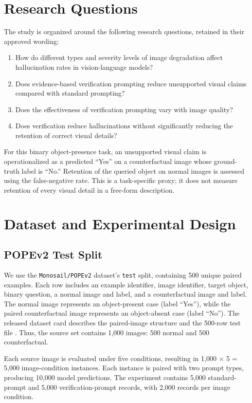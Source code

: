 \documentclass[conference]{IEEEtran}
\begin{document}
\section{Research Questions}
The study is organized around the following research questions, retained in their approved wording:
\begin{enumerate}[label=\textbf{RQ\arabic*:}]
\item How do different types and severity levels of image degradation affect hallucination rates in vision-language models?
\item Does evidence-based verification prompting reduce unsupported visual claims compared with standard prompting?
\item Does the effectiveness of verification prompting vary with image quality?
\item Does verification reduce hallucinations without significantly reducing the retention of correct visual details?
\end{enumerate}
For this binary object-presence task, an unsupported visual claim is operationalized as a predicted ``Yes'' on a counterfactual image whose ground-truth label is ``No.'' Retention of the queried object on normal images is assessed using the false-negative rate. This is a task-specific proxy; it does not measure retention of every visual detail in a free-form description.

\section{Dataset and Experimental Design}
\subsection{POPEv2 Test Split}
We use the \texttt{Monosail/POPEv2} dataset's \texttt{test} split, containing 500 unique paired examples. Each row includes an example identifier, image identifier, target object, binary question, a normal image and label, and a counterfactual image and label. The normal image represents an object-present case (label ``Yes''), while the paired counterfactual image represents an object-absent case (label ``No''). The released dataset card describes the paired-image structure and the 500-row test file \cite{popev2dataset}. Thus, the source set contains 1,000 images: 500 normal and 500 counterfactual.

Each source image is evaluated under five conditions, resulting in 1,000 $\times$ 5 = 5,000 image-condition instances. Each instance is paired with two prompt types, producing 10,000 model predictions. The experiment contains 5,000 standard-prompt and 5,000 verification-prompt records, with 2,000 records per image condition.
\end{document}
